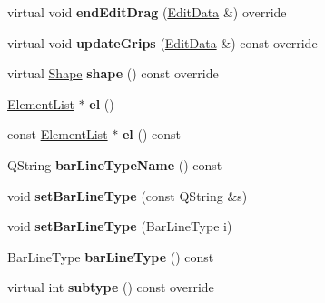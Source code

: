 \begin{DoxyCompactItemize}
virtual void {\bfseries end\+Edit\+Drag} (\hyperlink{class_ms_1_1_edit_data}{Edit\+Data} \&) override
\item 
\mbox{\label{class_ms_1_1_bar_line_a09be85c01740702066d17ddbe0a3726b}} 
virtual void {\bfseries update\+Grips} (\hyperlink{class_ms_1_1_edit_data}{Edit\+Data} \&) const override
\item 
\mbox{\label{class_ms_1_1_bar_line_a9601b3724d26474c212c203000d78065}} 
virtual \hyperlink{class_ms_1_1_shape}{Shape} {\bfseries shape} () const override
\item 
\mbox{\label{class_ms_1_1_bar_line_aeded832f48c1780ecc6766f370567758}} 
\hyperlink{class_ms_1_1_element_list}{Element\+List} $\ast$ {\bfseries el} ()
\item 
\mbox{\label{class_ms_1_1_bar_line_a08dcba0ffef76efd89064151b9603e69}} 
const \hyperlink{class_ms_1_1_element_list}{Element\+List} $\ast$ {\bfseries el} () const
\item 
\mbox{\label{class_ms_1_1_bar_line_a2faeb0d180c056eaf8e83205ae5bc3dd}} 
Q\+String {\bfseries bar\+Line\+Type\+Name} () const
\item 
\mbox{\label{class_ms_1_1_bar_line_aa7cce50a8d5f1e25e7a511039e311e3d}} 
void {\bfseries set\+Bar\+Line\+Type} (const Q\+String \&s)
\item 
\mbox{\label{class_ms_1_1_bar_line_a9d6ed82c3892a5ad1efb2361d1041d97}} 
void {\bfseries set\+Bar\+Line\+Type} (Bar\+Line\+Type i)
\item 
\mbox{\label{class_ms_1_1_bar_line_a4a0426d2e0676bda9cca5f61388cbcf6}} 
Bar\+Line\+Type {\bfseries bar\+Line\+Type} () const
\item 
\mbox{\label{class_ms_1_1_bar_line_a313fd09ff93a6ea4027a1b79c1dd4472}} 
virtual int {\bfseries subtype} () const override
\item 
\mbox{\label{class_ms_1_1_bar_line_a067e7fa0301e16c160919357bc26a8e1}} 

\end{DoxyCompactItemize}
